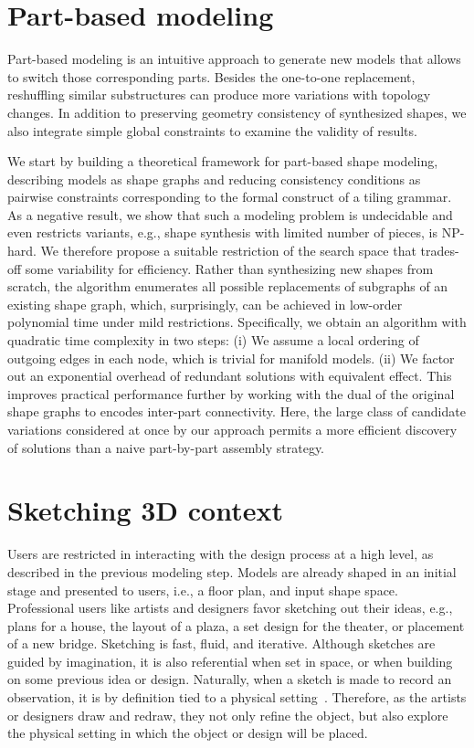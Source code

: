 \section{Part-based modeling}

Part-based modeling is an intuitive approach to generate new models that allows to switch those corresponding parts. Besides the one-to-one replacement, reshuffling similar substructures can produce more variations with topology changes. In addition to preserving geometry consistency of synthesized shapes, we also integrate simple global constraints to examine the validity of results.

We start by building a theoretical framework for part-based shape modeling, describing models as shape graphs and reducing consistency conditions as pairwise constraints corresponding to the formal construct of a tiling grammar. As a negative result, we show that such a modeling problem is undecidable and even restricts variants, e.g., shape synthesis with limited number of pieces, is NP-hard. We therefore propose a suitable restriction of the search space that trades-off some variability for efficiency. Rather than synthesizing new shapes from scratch, the algorithm enumerates all possible replacements of subgraphs of an existing shape graph, which, surprisingly, can be achieved in low-order polynomial time under mild restrictions. Specifically, we obtain an algorithm with quadratic time complexity in two steps: (i) We assume a local ordering of outgoing edges in each node, which is trivial for manifold models. (ii) We factor out an exponential overhead of redundant solutions with equivalent effect. This improves practical performance further by working with the dual of the original shape graphs to encodes inter-part connectivity. Here, the large class of candidate variations considered at once by our approach permits a more efficient discovery of solutions than a naive part-by-part assembly strategy.

\section{Sketching 3D context}

Users are restricted in interacting with the design process at a high level, as described in the previous modeling step. Models are already shaped in an initial stage and presented to users, i.e., a floor plan, and input shape space. Professional users like artists and designers favor sketching out their ideas, e.g., plans for a house, the layout of a plaza, a set design for the theater, or placement of a new bridge. Sketching is fast, fluid, and iterative. Although sketches are guided by imagination, it is also referential when set in space, or when building on some previous idea or design. Naturally, when a sketch is made to record an observation, it is by definition tied to a physical setting~\cite{NecessityDrawing77}. Therefore, as the artists or designers draw and redraw, they not only refine the object, but also explore the physical setting in which the object or design will be placed.

